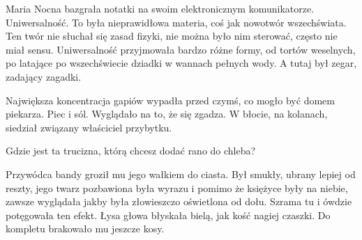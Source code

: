 Maria Nocna bazgrała notatki na swoim elektronicznym komunikatorze.
Uniwersalność. 
To była nieprawidłowa materia, coś jak nowotwór wszechświata.
Ten twór nie słuchał się zasad fizyki, nie można było nim sterować, często nie miał sensu.
Uniwersalność przyjmowała bardzo różne formy, od tortów weselnych, po latające po wszechświecie dziadki w wannach pełnych wody.
A tutaj był zegar, zadający zagadki.

Największa koncentracja gapiów wypadła przed czymś, co mogło być domem piekarza.
Piec i sól. Wyglądało na to, że się zgadza.
W błocie, na kolanach, siedział związany właściciel przybytku.
\begin{dialogue}
	\ds{} Gdzie jest ta trucizna, którą chcesz dodać rano do chleba?
\end{dialogue}

	Przywódca bandy groził mu jego wałkiem do ciasta. 
	Był smukły, ubrany lepiej od reszty, jego twarz pozbawiona była wyrazu i pomimo że księżyce były na niebie,
	zawsze wyglądała jakby była złowieszczo oświetlona od dołu.
	Szrama tu i ówdzie potęgowała ten efekt.
	Łysa głowa błyskała bielą, jak kość nagiej czaszki.
	Do kompletu brakowało mu jeszcze kosy.
	
